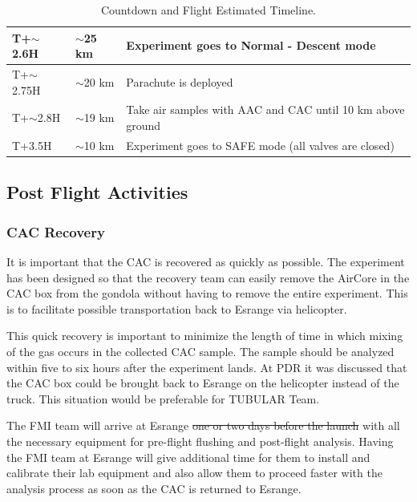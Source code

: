 \documentclass[a4paper,12pt,oneside]{article} %
\providecommand{\DIFaddtex}[1]{{\protect\color{blue}\uwave{#1}}} %
\providecommand{\DIFdeltex}[1]{{\protect\color{red}\sout{#1}}}                      %
\providecommand{\DIFaddbegin}{} %
\providecommand{\DIFaddend}{} %
\providecommand{\DIFdelbegin}{} %
\providecommand{\DIFdelend}{} %
\providecommand{\DIFadd}[1]{\texorpdfstring{\DIFaddtex{#1}}{#1}} %
\providecommand{\DIFdel}[1]{\texorpdfstring{\DIFdeltex{#1}}{}} %
\newcommand{\DIFscaledelfig}{0.5}
\newlength{\DIFdelgraphicswidth} %
\newlength{\DIFdelgraphicsheight} %
\newcommand{\DIFaddincludegraphics}[2][]{{\color{blue}\fbox{\DIFOincludegraphics[#1]{#2}}}} %
\newcommand{\DIFdelincludegraphics}[2][]{%
\sbox{\DIFdelgraphicsbox}{\DIFOincludegraphics[#1]{#2}}%
\settoboxwidth{\DIFdelgraphicswidth}{\DIFdelgraphicsbox} %
\settoboxtotalheight{\DIFdelgraphicsheight}{\DIFdelgraphicsbox} %
\scalebox{\DIFscaledelfig}{%
\parbox[b]{\DIFdelgraphicswidth}{\usebox{\DIFdelgraphicsbox}\\[-\baselineskip] \rule{\DIFdelgraphicswidth}{0em}}\llap{\resizebox{\DIFdelgraphicswidth}{\DIFdelgraphicsheight}{%
\setlength{\unitlength}{\DIFdelgraphicswidth}%
\begin{picture}(1,1)%
\thicklines\linethickness{2pt} %
{\color[rgb]{1,0,0}\put(0,0){\framebox(1,1){}}}%
{\color[rgb]{1,0,0}\put(0,0){\line( 1,1){1}}}%
{\color[rgb]{1,0,0}\put(0,1){\line(1,-1){1}}}%
\end{picture}%
}\hspace*{3pt}}} %
} %
\DeclareRobustCommand{\DIFaddbegin}{\DIFOaddbegin \let\includegraphics\DIFaddincludegraphics} %
\DeclareRobustCommand{\DIFaddend}{\DIFOaddend \let\includegraphics\DIFOincludegraphics} %
\DeclareRobustCommand{\DIFdelbegin}{\DIFOdelbegin \let\includegraphics\DIFdelincludegraphics} %
\DeclareRobustCommand{\DIFdelend}{\DIFOaddend \let\includegraphics\DIFOincludegraphics} %
\begin{document}
\begin{table}[H]
\begin{tabular}{|l|l|l|}
T+$\sim$2.6H                     & $\sim$25 km                        & Experiment goes to Normal - Descent mode                 \\ \hline
T+$\sim$2.75H                    & $\sim$20 km                        & Parachute is deployed                                    \\ \hline
T+$\sim$2.8H                     & $\sim$19 km                        & Take air samples with AAC and CAC until 10 km above ground                 \\ \hline
T+3.5H                           & $\sim$10 km                         & Experiment goes to SAFE mode (all valves are closed)                            \\ \hline
\end{tabular}
\caption{Countdown and Flight Estimated Timeline.}
\label{tab:countflight}
\end{table}
\raggedbottom
\pagebreak
\subsection{Post Flight Activities}

\subsubsection{CAC Recovery}
It is important that the CAC is recovered as quickly as possible. The experiment has been designed so that the recovery team can easily remove the AirCore in the CAC box from the gondola without having to remove the entire experiment. This is to facilitate possible transportation back to Esrange via helicopter.

This quick recovery is important to minimize the length of time in which mixing of the gas occurs in the collected CAC sample. The sample should be analyzed within five to six hours after the experiment lands. At PDR it was discussed that the CAC box could be brought back to Esrange on the helicopter instead of the truck. This situation would be preferable for TUBULAR Team. 
\DIFaddbegin 

\DIFaddend The FMI team will arrive at Esrange \DIFdelbegin \DIFdel{one or two days before the launch }\DIFdelend \DIFaddbegin \DIFadd{on the 12th of October }\DIFaddend with all the necessary equipment for pre-flight flushing and post-flight analysis. Having the FMI team at Esrange will give additional time for them to install and calibrate their lab equipment and also allow them to proceed faster with the analysis process as soon as the CAC is returned to Esrange. 
\end{document}
